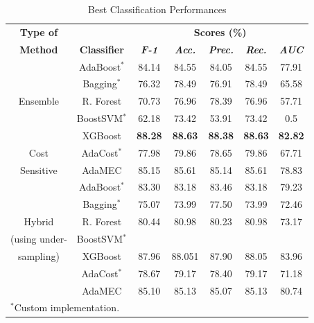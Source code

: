 \documentclass[conference]{IEEEtran}
\begin{document}
\begin{table}[htbp]
\caption{Best Classification Performances}

\begin{center}

\begin{tabular}{|c|c|c|c|c|c|c|}

\hline
\textbf{Type of} & & \multicolumn{5}{|c|}{\textbf{Scores (\%)}} \\
\cline{3-7}

\textbf{Method} & \textbf{Classifier} &\textbf{\textit{F-1}}& \textbf{\textit{Acc.}}&\textbf{\textit{Prec.}}&\textbf{\textit{Rec.}}&\textbf{\textit{AUC}}\\
\hline

& AdaBoost$^*$ &84.14&84.55&84.05&84.55&77.91  \\
\cline{2-7}

& Bagging$^*$ &76.32&78.49&76.91&78.49&65.58  \\
\cline{2-7}

Ensemble & R. Forest &70.73&76.96&78.39&76.96&57.71  \\
\cline{2-7}

& BoostSVM$^*$ &62.18&73.42&53.91&73.42&0.5  \\
\cline{2-7}

& XGBoost  &\textbf{88.28}&\textbf{88.63}&\textbf{88.38}&\textbf{88.63}&\textbf{82.82} \\
\hline

Cost & AdaCost$^*$ &77.98&79.86&78.65&79.86&67.71  \\
\cline{2-7}

Sensitive& AdaMEC &85.15&85.61&85.14&85.61&78.83  \\
\hline

& AdaBoost$^*$ &83.30&83.18&83.46&83.18&79.23  \\
\cline{2-7}

& Bagging$^*$ &75.07&73.99&77.50&73.99&72.46  \\
\cline{2-7}

Hybrid & R. Forest &80.44&80.98&80.23&80.98&73.17  \\
\cline{2-7}

(using under-& BoostSVM$^*$   & & & & &\\
\cline{2-7}

sampling)& XGBoost  &87.96&88.051&87.90&88.05&83.96 \\
\cline{2-7}

 & AdaCost$^*$ &78.67&79.17&78.40&79.17&71.18  \\
\cline{2-7}

& AdaMEC &85.10&85.13&85.07&85.13&80.74  \\
\hline

\multicolumn{4}{l}{$^{\mathrm{*}}$Custom implementation.}

\end{tabular}

\label{tab:PerformanceComparison}
\end{center}
\end{table}
\end{document}
